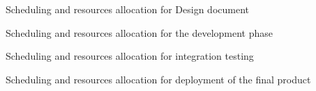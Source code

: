 \documentclass[a4paper,11pt]{report} %
\begin{document}
		\begin{center}
			Scheduling and resources allocation for Design document
		\end{center}
		\begin{minipage}{\linewidth}
		\end{minipage}		
		\begin{center}
			Scheduling and resources allocation for the development phase
		\end{center}
		\begin{minipage}{\linewidth}
		\end{minipage}	
		\begin{center}
			Scheduling and resources allocation for integration testing
		\end{center}		
		\begin{minipage}{\linewidth}
		\end{minipage}	
		\begin{center}
			Scheduling and resources allocation for deployment of the final product
		\end{center}	
		\begin{minipage}{\linewidth}
		\end{minipage}		
	
\end{document}
